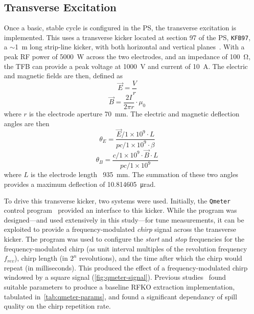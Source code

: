 \documentclass[11pt]{report}
\begin{document}
\subsection{Transverse Excitation}
Once a basic, stable cycle is configured in the PS, the transverse excitation is implemented. This uses a transverse kicker located at section 97 of the PS, \verb|KFB97|, a $\sim$\qty{1}{\meter} long strip-line kicker, with both horizontal and vertical planes~\cite{Sterbini:2158994}. With a peak RF power of \qty{5000}{\watt} across the two electrodes, and an impedance of \qty{100}{\ohm}, the TFB can provide a peak voltage at \qty{1000}{\volt} and current of \qty{10}{\ampere}. The electric and magnetic fields are then, defined as
\begin{equation}
  \vec E=\frac Vr
\end{equation}
\begin{equation}
  \vec B=\frac {2I}{2\pi r}\cdot \mu_0
\end{equation}
where $r$ is the electrode aperture \qty{70}{\milli\meter}. The electric and magnetic deflection angles are then
\begin{equation}
  \theta_E = \frac{\vec E / 1\times10^9\cdot L}{pc/1\times10^9 \cdot\beta}
  \label{eq:kick-electric}
\end{equation}
\begin{equation}
  \theta_B = \frac{c/1\times10^9\cdot \vec B\cdot L}{pc/1\times10^9}
  \label{eq:kick-magnetic}
\end{equation} where $L$ is the electrode length~\cite[3.1-3.2]{bouvet} \qty{935}{\milli\meter}.
The summation of these two angles provides a maximum deflection of \qty{10.814605}{\micro\radian}.

To drive this transverse kicker, two systems were used. Initially, the \verb|Qmeter| control program~\cite{Gasior:895142} provided an interface to this kicker. While the program was designed---and used extensively in this study---for tune measurements, it can be exploited to provide a frequency-modulated \textit{chirp} signal across the transverse kicker. The program was used to configure the \textit{start} and \textit{stop} frequencies for the frequency-modulated chirp (as unit interval multiples of the revolution frequency $f_{rev}$), chirp length (in $2^n$ revolutions), and the time after which the chirp would repeat (in milliseconds). This produced the effect of a frequency-modulated chirp windowed by a square signal (\autoref{fig:qmeter-signal}). Previous studies~\cite{ipac} found suitable parameters to produce a baseline RFKO extraction implementation, tabulated in~\autoref{tab:qmeter-params}, and found a significant dependancy of spill quality on the chirp repetition rate.
\end{document}
